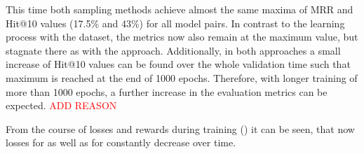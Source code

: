 This time both sampling methods achieve almost the same maxima of MRR and Hit@10 values (17.5\% and 43\%) for all model pairs.
In contrast to the learning process with the \umls dataset, the metrics now also \usmax remain at the maximum value, but stagnate there as with the \ussoftmax approach.
Additionally, in both approaches a small increase of Hit@10 values can be found over the whole validation time such that maximum is reached at the end of 1000 epochs.
Therefore, with longer training of more than 1000 epochs, a further increase in the evaluation metrics can be expected.
\textcolor{red}{ADD REASON}

From the course of losses and rewards during training () it can be seen, that now losses for \usmax as well as for \ussoftmax constantly decrease over time.
